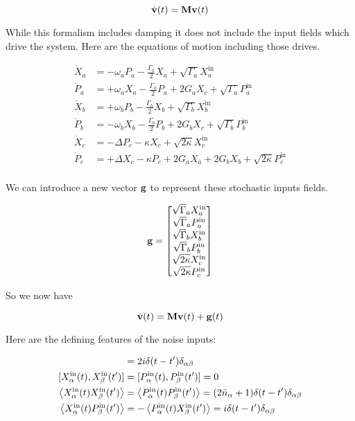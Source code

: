 \documentclass[12pt]{article}
\newcommand{\bv}[1]{\bold{#1}}
\begin{document}
\begin{equation}
\dot{\bv{v}}(t) = \bv{M}\bv{v}(t)
\end{equation}

While this formalism includes damping it does not include the input fields which drive the system. 
Here are the equations of motion including those drives.

\begin{align*}
\dot{X}_a &= -\omega_a P_a -\frac{\Gamma_a}{2} X_a + \sqrt{\Gamma_a}X_a^{\text{in}}\\
\dot{P}_a &= +\omega_a X_a -\frac{\Gamma_a}{2} P_a + 2 G_a X_c + \sqrt{\Gamma_a}P_a^{\text{in}}\\
\dot{X}_b &= +\omega_b P_b -\frac{\Gamma_b}{2} X_b + \sqrt{\Gamma_b}X_b^{\text{in}}\\
\dot{P}_b &= -\omega_b X_b -\frac{\Gamma_b}{2} P_b + 2 G_b X_c + \sqrt{\Gamma_b}P_b^{\text{in}}\\
\dot{X}_c &= -\Delta P_c - \kappa X_c + \sqrt{2\kappa}X_c^{\text{in}}\\
\dot{P}_c &= +\Delta X_c - \kappa P_c + 2 G_a X_a + 2 G_b X_b + \sqrt{2\kappa}P_c^{\text{in}}\\
\end{align*}

We can introduce a new vector $\bv{g}$ to represent these stochastic inputs fields.

\begin{equation}
\bv{g} = \begin{bmatrix}
\sqrt{\Gamma}_a X_a^{\text{in}}\\
\sqrt{\Gamma}_a P_a^{\text{in}}\\
\sqrt{\Gamma}_b X_b^{\text{in}}\\
\sqrt{\Gamma}_b P_b^{\text{in}}\\
\sqrt{2\kappa} X_c^{\text{in}}\\
\sqrt{2\kappa} P_c^{\text{in}}\\
\end{bmatrix}
\end{equation}

So we now have

\[
\dot{\bv{v}}(t) = \bv{M} \bv{v}(t) + \bv{g}(t)
\]

Here are the defining features of the noise inputs:

\begin{align*}
[X_{\alpha}^{\text{in}}(t),P_{\beta}^{\text{in}}(t')] &= 2i\delta(t-t')\delta_{\alpha \beta}\\
[X_{\alpha}^{\text{in}}(t),X_{\beta}^{\text{in}}(t')]& = [P_{\alpha}^{\text{in}}(t),P_{\beta}^{\text{in}}(t')] = 0\\
\Braket{X_{\alpha}^{\text{in}}(t)X_{\beta}^{\text{in}}(t')} &= \Braket{P_{\alpha}^{\text{in}}(t)P_{\beta}^{\text{in}}(t')} = (2\bar{n}_{\alpha} +1)\delta(t-t')\delta_{\alpha \beta}\\
\Braket{X_{\alpha}^{\text{in}}(t)P_{\beta}^{\text{in}}(t')} &= -\Braket{P_{\alpha}^{\text{in}}(t)X_{\beta}^{\text{in}}(t')} = i\delta(t-t')\delta_{\alpha \beta}
\end{align*}
\end{document}
